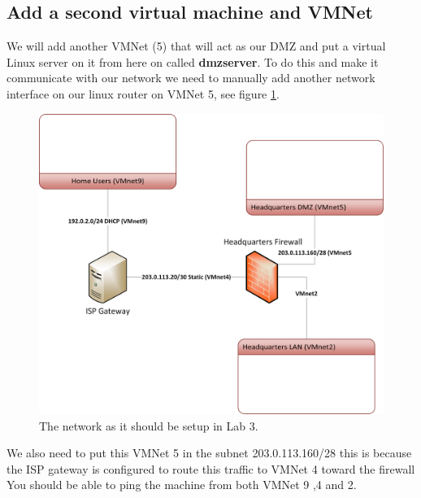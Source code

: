 \documentclass[paper=a4, fontsize=11pt]{report} %
\begin{document}
\subsection{Add a second virtual machine and VMNet}
We will add another VMNet (5) that will act as our DMZ and put a virtual Linux server on it from here on called \textbf{dmzserver}.  To do this and make it communicate with our network we need to manually add another network interface on our linux router on VMNet 5, see figure \figurename \ref{fig:network}.
\begin{figure}[h]
\centering
\includegraphics[width=1\linewidth]{./network}
\caption[Figure over network in Lab 3]{The network as it should be setup in Lab 3.}
\label{fig:network}
\end{figure}
We also need to put this VMNet 5 in the subnet 203.0.113.160/28 this is because the ISP gateway is configured to route this traffic to VMNet 4 toward the firewall You should be able to ping the machine from both VMNet 9 ,4 and 2.
\end{document}
